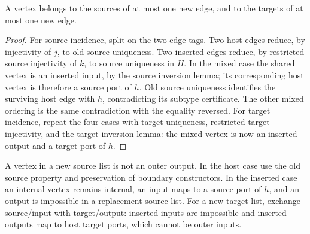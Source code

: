 \begin{lemma}
A vertex belongs to the sources of at most one new edge, and to the targets
of at most one new edge.
\end{lemma}
\begin{proof}
For source incidence, split on the two edge tags. Two host edges reduce, by
injectivity of $j$, to old source uniqueness. Two inserted edges reduce, by
restricted source injectivity of $k$, to source uniqueness in $H$. In the mixed
case the shared vertex is an inserted input, by the source inversion lemma;
its corresponding host vertex is therefore a source port of $h$. Old source
uniqueness identifies the surviving host edge with $h$, contradicting its subtype
certificate. The other mixed ordering is the same contradiction with the equality
reversed. For target incidence, repeat the four cases with target uniqueness,
restricted target injectivity, and the target inversion lemma: the mixed vertex
is now an inserted output and a target port of $h$.
\end{proof}
A vertex in a new source list is not an outer output. In the host case use the
old source property and preservation of boundary constructors. In the inserted
case an internal vertex remains internal, an input maps to a source port of $h$,
and an output is impossible in a replacement source list. For a new target list,
exchange source/input with target/output: inserted inputs are impossible and
inserted outputs map to host target ports, which cannot be outer inputs.

